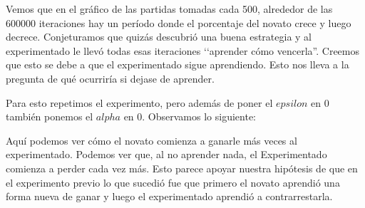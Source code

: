 Vemos que en el gráfico de las partidas tomadas cada 500, alrededor de las 600000 iteraciones hay un período donde el porcentaje del novato crece y luego decrece. Conjeturamos que quizás descubrió una buena estrategia y al experimentado le llevó todas esas iteraciones ‘‘aprender cómo vencerla''. Creemos que esto se debe a que el experimentado sigue aprendiendo. Esto nos lleva a la pregunta de qué ocurriría si dejase de aprender.

Para esto repetimos el experimento, pero además de poner el $epsilon$ en 0 también ponemos el $alpha$ en 0. Observamos lo siguiente:



Aquí podemos ver cómo el novato comienza a ganarle más veces al experimentado. Podemos ver que, al no aprender nada, el Experimentado comienza a perder cada vez más. Esto parece apoyar nuestra hipótesis de que en el experimento previo lo que sucedió fue que primero el novato aprendió una forma nueva de ganar y luego el experimentado aprendió a contrarrestarla.
